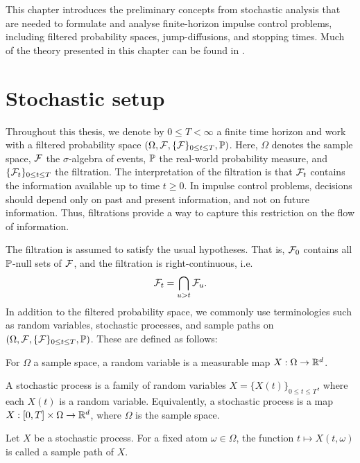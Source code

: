 \label{section: Preliminaries}
This chapter introduces the preliminary concepts from stochastic analysis that are needed to formulate and analyse finite-horizon impulse control problems, including filtered probability spaces, jump-diffusions, and stopping times. Much of the theory presented in this chapter can be found in \cite{applebaum2009levy, jarrow2018continuous, oksendal2007applied}.

\section{Stochastic setup}
\label{section: stochastic setup}
Throughout this thesis, we denote by $0\leq T<\infty$ a finite time horizon and work with a filtered probability space $(\Omega, \mathcal{F}, \{\mathcal{F}\}_{0 \leq t \leq T}, \mathbb{P})$. Here, $\Omega$ denotes the sample space, $\mathcal{F}$ the $\sigma$-algebra of events, $\mathbb{P}$ the real-world probability measure, and $\{\mathcal{F}_t\}_{0 \leq t \leq T}$ the filtration. The interpretation of the filtration is that $\mathcal{F}_t$ contains the information available up to time $t\geq 0$. In impulse control problems, decisions should depend only on past and present information, and not on future information. Thus, filtrations provide a way to capture this restriction on the flow of information.

The filtration is assumed to satisfy the usual hypotheses. That is, $\mathcal{F}_0$ contains all $\mathbb{P}$-null sets of $\mathcal{F}$, and the filtration is right-continuous, i.e.
\begin{equation*}
    \mathcal{F}_t = \bigcap_{u>t}\mathcal{F}_u.
\end{equation*}
In addition to the filtered probability space, we commonly use terminologies such as random variables, stochastic processes, and sample paths on $(\Omega, \mathcal{F}, \{\mathcal{F}\}_{0 \leq t \leq T}, \mathbb{P})$. These are defined as follows:
\begin{definition}
    For $\Omega$ a sample space, a random variable is a measurable map $X: \Omega \rightarrow \mathbb{R}^d$. 
\end{definition}
\begin{definition}
    A stochastic process is a family of random variables $X=\{X(t)\}_{0 \leq t \leq T}$, where each $X(t)$ is a random variable. Equivalently, a stochastic process is a map $X: [0,T]\times\Omega \rightarrow \mathbb{R}^d$, where $\Omega$ is the sample space.
\end{definition}
\begin{definition}
    Let $X$ be a stochastic process. For a fixed atom $\omega \in \Omega$, the function $t \mapsto X(t,\omega)$ is called a sample path of $X$. 
\end{definition}

